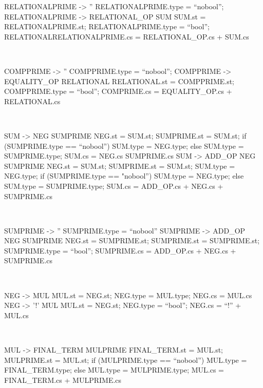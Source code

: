 \begin{verbbox}[\scriptsize]
RELATIONALPRIME -> ''
{
RELATIONALPRIME.type = “nobool”;
}
RELATIONALPRIME -> RELATIONAL_OP SUM
{
SUM.st = RELATIONALPRIME.st;
RELATIONALPRIME.type = “bool”;
RELATIONALRELATIONALPRIME.cs = RELATIONAL_OP.cs + SUM.cs
}
\end{verbbox} 
\theverbbox\\

\begin{verbbox}[\scriptsize]
COMPPRIME -> ''
{
COMPPRIME.type = “nobool”;
}
COMPPRIME -> EQUALITY_OP RELATIONAL
{
RELATIONAL.st = COMPPRIME.st;
COMPPRIME.type = “bool”;
COMPRIME.cs = EQUALITY_OP.cs + RELATIONAL.cs
}
\end{verbbox} 
\theverbbox\\

\begin{verbbox}[\scriptsize]
SUM -> NEG SUMPRIME
{
NEG.st = SUM.st;
SUMPRIME.st = SUM.st;
if (SUMPRIME.type == “nobool”) {
    SUM.type = NEG.type;
} else {
    SUM.type = SUMPRIME.type;
}
SUM.cs = NEG.cs SUMPRIME.cs
}
SUM -> ADD_OP NEG SUMPRIME
{
NEG.st = SUM.st;
SUMPRIME.st = SUM.st;
SUM.type = NEG.type;
if (SUMPRIME.type == "nobool”) {
    SUM.type = NEG.type;
} else {
    SUM.type = SUMPRIME.type;
}
SUM.cs = ADD_OP.cs + NEG.cs + SUMPRIME.cs
}
\end{verbbox} 
\theverbbox\\

\begin{verbbox}[\scriptsize]
SUMPRIME -> ''
{
SUMPRIME.type = “nobool”
}
SUMPRIME -> ADD_OP NEG SUMPRIME
{
NEG.st = SUMPRIME.st;
SUMPRIME.st = SUMPRIME.st;
SUMPRIME.type = “bool”;
SUMPRIME.cs = ADD_OP.cs + NEG.cs + SUMPRIME.cs
}
\end{verbbox} 
\theverbbox\\

\begin{verbbox}[\scriptsize]
NEG -> MUL
{
MUL.st = NEG.st;
NEG.type = MUL.type;
NEG.cs = MUL.cs
}
NEG -> '!' MUL
{
MUL.st = NEG.st;
NEG.type = “bool”;
NEG.cs = “!” + MUL.cs
}
\end{verbbox} 
\theverbbox\\

\begin{verbbox}[\scriptsize]
MUL -> FINAL_TERM MULPRIME
{
FINAL_TERM.st = MUL.st;
MULPRIME.st = MUL.st;
if (MULPRIME.type == “nobool”) {
    MUL.type = FINAL_TERM.type;
} else {
    MUL.type = MULPRIME.type;
}
MUL.cs = FINAL_TERM.cs + MULPRIME.cs
}
\end{verbbox} 
\theverbbox\\

